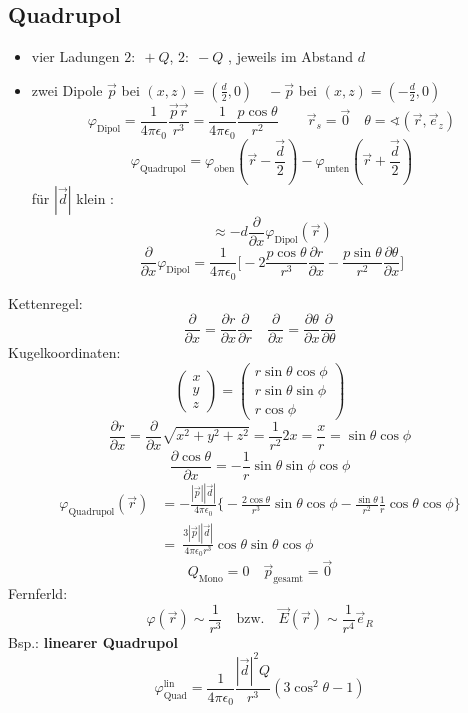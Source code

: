 \documentclass[titlepage,12pt,a4paper,ngerman]{report}
\newcommand{\tx}[1]{\textrm{#1}}
\begin{document}
\subsection{Quadrupol}
\begin{itemize}
\item vier Ladungen $ 2: \; +Q$, $ 2: \; -Q$ , jeweils im Abstand $d$
\item zwei Dipole $\vec{p}$ bei $(x,z) = (\frac{d}{2}, 0) \quad -\vec{p}$ bei $(x,z) = (-\frac{d}{2}, 0)$
$$ \varphi_{\tx{Dipol}} = \frac{1}{4\pi\epsilon_0} \frac{\vec{p}\vec{r}}{r^3} = \frac{1}{4\pi\epsilon_0} \frac{p \cos \theta}{r^2} \qquad \vec{r}_s = \vec{0} \quad \theta = \sphericalangle (\vec{r}, \vec{e}_z)$$
$$\varphi _{\tx{Quadrupol}} = \varphi_{\tx{oben}}(\vec{r}- \frac{\vec{d}}{2}) - \varphi_{\tx{unten}}(\vec{r}+ \frac{\vec{d}}{2})$$
für $|\vec{d}|$ klein : $$\approx -d \frac{\partial}{\partial x } \varphi_{\tx{Dipol}} (\vec{r})$$
$$\frac{\partial }{\partial x} \varphi_{\tx{Dipol}} = \frac{1}{4\pi\epsilon_0} \bigg[ -2 \frac{p \cos \theta}{r^3} \frac{\partial r }{\partial x} - \frac{p \sin \theta }{r^2} \frac{\partial \theta}{\partial x} \bigg]$$
\end{itemize}
Kettenregel: 
$$ \frac{\partial}{\partial x} = \frac{\partial r}{\partial x} \frac{\partial}{\partial r} \quad \frac{\partial}{\partial x} = \frac{\partial \theta}{\partial x} \frac{\partial}{\partial \theta}$$
Kugelkoordinaten: $$ \begin{pmatrix}
x\\
y\\
z
\end{pmatrix} = \begin{pmatrix}
r \sin \theta \cos \phi \\
r \sin \theta \sin \phi \\
r \cos \phi
\end{pmatrix}$$
$$ \frac{\partial r}{\partial x} = \frac{\partial}{\partial x} \sqrt{x^2+y^2+z^2} = \frac{1}{r^2} 2x = \frac{x}{r} = \sin \theta \cos \phi $$
$$\frac{\partial \cos \theta}{\partial x} = -\frac{1}{r} \sin \theta \sin \phi \cos \phi$$
\begin{align*}
\varphi_{\tx{Quadrupol}}(\vec{r}) &= -\frac{|\vec{p}||\vec{d}|}{4\pi\epsilon_0} \bigg\{ - \frac{2 \cos \theta }{r^3} \sin \theta \cos \phi - \frac{\sin \theta}{r^2} \frac{1}{r} \cos \theta \cos \phi \bigg\} \\
& = \  \frac{3|\vec{p}||\vec{d}|}{4\pi\epsilon_0 r^3} \cos \theta \sin \theta \cos \phi
\end{align*}
$$Q_{\tx{Mono}} = 0  \quad \vec{p}_{\tx{gesamt}} = \vec{0}$$
Fernferld: $$ \varphi(\vec{r}) \sim \frac{1}{r^3} \quad \textrm{bzw.} \quad \vec{E} (\vec{r}) \sim \frac{1}{r^4} \vec{e}_R$$
Bsp.: \textbf{linearer Quadrupol}
$$\varphi^{\tx{lin}}_{\tx{Quad}} = \frac{1}{4\pi\epsilon_0} \frac{|\vec{d}|^2Q}{r^3} (3 \cos^2\theta -1)$$
\end{document}
